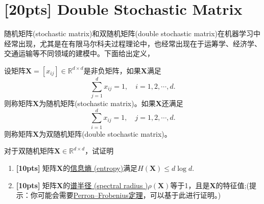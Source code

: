 \documentclass[a4paper,UTF8]{article}
\numberwithin{equation}{section}
\begin{document}
\section{[20pts] Double Stochastic Matrix}
随机矩阵(stochastic matrix)和双随机矩阵(double stochastic matrix)在机器学习中经常出现，尤其是在有限马尔科夫过程理论中，也经常出现在于运筹学、经济学、交通运输等不同领域的建模中。下面给出定义，
\begin{def-box}[随机矩阵]
设矩阵$\mathbf{X}=[x_{ij}]\in \mathbb{R}^{d\times d}$是非负矩阵，如果$\mathbf{X}$满足
\begin{equation}
	\label{eq-sto-matrix}
	\sum_{j=1}^d x_{ij} = 1,\quad i=1,2,\cdots,d.
\end{equation}
则称矩阵$\mathbf{X}$为随机矩阵(stochastic matrix)。如果$\mathbf{X}$还满足
\begin{equation}
	\label{eq-double-sto-matrix}
	\sum_{i=1}^d x_{ij} = 1,\quad j=1,2,\cdots,d.
\end{equation}
则称矩阵$\mathbf{X}$为双随机矩阵(double stochastic matrix)。
\end{def-box}
对于双随机矩阵$\mathbf{X} \in \mathbb{R}^{d\times d}$，试证明
\begin{enumerate}[ {(}1{)}]
\item \textbf{[10pts]} 矩阵$\mathbf{X}$的\href{https://en.wikipedia.org/wiki/Entropy_(information_theory)}{信息熵 (entropy)}满足$H(\mathbf{X}) \leq d\log d$.
\item \textbf{[10pts]} 矩阵$\mathbf{X}$的\href{https://en.wikipedia.org/wiki/Spectral_radius}{谱半径 (spectral radius
)}$\rho(\mathbf{X})$等于1，且是$\mathbf{X}$的特征值;(提示：你可能会需要\href{https://en.wikipedia.org/wiki/Perron%E2%80%93Frobenius_theorem}{Perron–Frobenius定理}，可以基于此进行证明。)
\end{enumerate}
\end{document}
